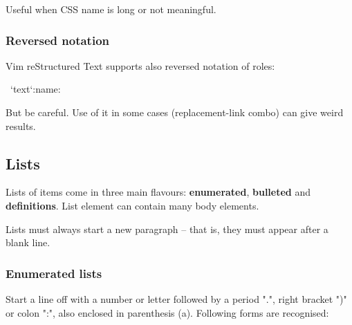 \documentclass[12pt]{article}
\begin{document}
Useful when CSS name is long or not meaningful.

\hypertarget{lreversed-notation}{}
\subsubsection{Reversed notation}

Vim reStructured Text supports also reversed notation of roles:

\begin{ttfamily}\begin{flushleft}
\mbox{~`text`:name:}\\
\end{flushleft}\end{ttfamily}

But be careful. Use of it in some cases (replacement-link combo) can give
weird results.

\hypertarget{llists}{}
\subsection{Lists}

Lists of items come in three main flavours: \textbf{enumerated}, \textbf{bulleted} and
\textbf{definitions}. List element can contain many body elements.

Lists must always start a new paragraph -- that is, they must appear
after a blank line.

\hypertarget{lenumerated-lists}{}
\subsubsection{Enumerated lists}

Start a line off with a number or letter followed by a period ".",
right bracket ")" or colon ":", also enclosed in parenthesis (a). Following
forms are recognised:
\end{document}
